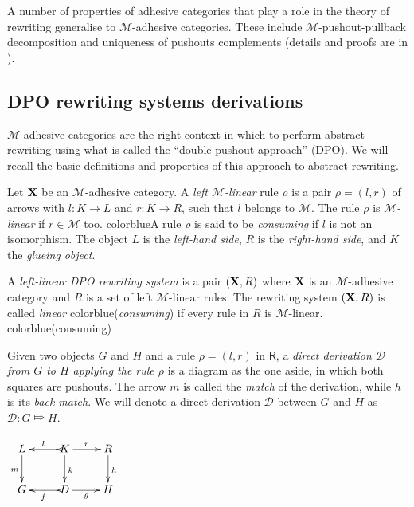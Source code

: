 \documentclass[a4paper,UKenglish,cleveref,pdftex, thm-restate,numberwithinsect,anonymous]{lipics}
\newcommand{\full}[1]{{color{blue}#1}}
\newcommand{\full}[1]{}
\def\R{\mathsf{R}}
\def\X{\textbf {\textup{X}}}
\def\G{\textbf {\textup{G}}}
\newcommand{\dder}[1]{\mathscr{#1}}
\begin{document}
A number of properties of adhesive categories that play a role in the
theory of rewriting generalise to $\mathcal{M}$-adhesive
categories. These include $\mathcal{M}$-pushout-pullback decomposition
and uniqueness of pushouts complements (details and proofs are in
).

\subsection{DPO rewriting systems derivations}\label{subsec:DPO}

$\mathcal{M}$-adhesive categories are the right context in which to
perform abstract rewriting using what is called the ``double pushout
approach'' (DPO). We will recall the basic definitions and properties
of this approach to abstract rewriting.


\begin{definition}
  Let $\X$ be an $\mathcal{M}$-adhesive category. A \emph{left
    $\mathcal{M}$-linear} rule $\rho$ is a pair $\rho = (l,r)$ of
  arrows with $l: K \to L$ and $r: K \to R$, such that $l$ belongs to
  $\mathcal{M}$.  The rule $\rho$ is \emph{$\mathcal{M}$-linear} if
  $r\in \mathcal{M}$ too.
  \full{A rule $\rho$ is said to be
    \emph{consuming} if $l$ is not an isomorphism.}%
  The object $L$ is
  the \emph{left-hand side}, $R$ is the \emph{right-hand side}, and
  $K$ the \emph{glueing object}.

  A \emph{left-linear DPO rewriting system} is a pair $(\X, \R)$ where
  $\X$ is an $\mathcal{M}$-adhesive category and $R$ is a set of left
  $\mathcal{M}$-linear rules. The rewriting system $(\X, \R)$ is
  called \emph{linear}
  \full{(\emph{consuming})}
  if every rule in $R$ is
  $\mathcal{M}$-linear.
  \full{(consuming)}

  \noindent
  \parbox{10cm}{\hspace{15pt}Given two objects $G$ and $H$ and a rule
    $\rho=(l,r)$ in $\R$, a \emph{direct derivation $\mathscr{D}$ from
      $G$ to $H$ applying the rule $\rho$} is a diagram as the one
    aside, in which both squares are pushouts. The arrow $m$ is called
    the \emph{match} of the derivation, while $h$ is its
    \emph{back-match}.  We will denote a direct derivation $\dder{D}$
    between $G$ and $H$ as $\dder{D}\colon G\Mapsto H$. }
  \parbox{3cm}{$\xymatrix{L \ar[d]_{m}& K \ar[d]^{k}\ar@{>->}[l]_{l}
      \ar[r]^{r} & R \ar[d]^{h}\\G & \ar@{>->}[l]^{f} D \ar[r]_{g}&
      H}$}
\end{definition}
\end{document}
